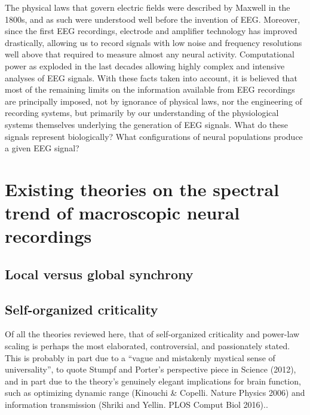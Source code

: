 The physical laws that govern electric fields were described by Maxwell in the 1800s, and as such were understood well before the invention of EEG. Moreover, since the first EEG recordings, electrode and amplifier technology has improved drastically, allowing us to record signals with low noise and frequency resolutions well above that required to measure almost any neural activity. Computational power as exploded in the last decades allowing highly complex and intensive analyses of EEG signals. With these facts taken into account, it is believed that most of the remaining limits on the information available from EEG recordings are principally imposed, not by ignorance of physical laws, nor the engineering of recording systems, but primarily by our understanding of the physiological systems themselves underlying the generation of EEG signals. What do these signals represent biologically? What configurations of neural populations produce a given EEG signal?

\newpage

\section{Existing theories on the spectral trend of macroscopic neural recordings}
\subsection{Local versus global synchrony}

\subsection{Self-organized criticality}
Of all the theories reviewed here, that of self-organized criticality and power-law scaling is perhaps the most elaborated, controversial, and passionately stated. This is probably in part due to a “vague and mistakenly mystical sense of universality”, to quote Stumpf and Porter’s perspective piece in Science (2012), and in part due to the theory’s genuinely elegant implications for brain function, such as optimizing dynamic range (Kinouchi & Copelli. Nature Physics 2006) and information transmission (Shriki and Yellin. PLOS Comput Biol 2016).. 

